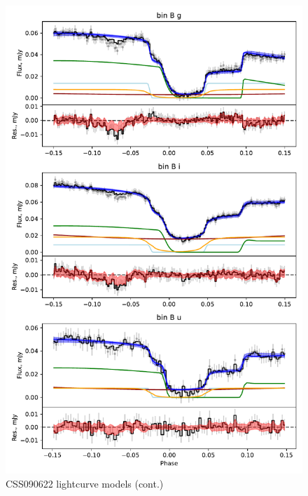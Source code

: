 \begin{figure}
    \centering
    \includegraphics[width=\textwidth]{figures/results/CSS090622/CSS090622_2.pdf}
    \caption{CSS090622 lightcurve models (cont.)}
    \label{fig:CSS090622 all lightcurves cont 1}
\end{figure}
